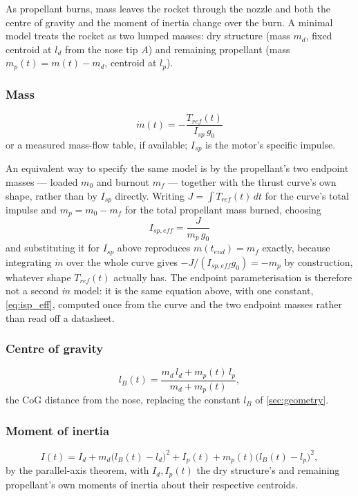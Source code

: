 As propellant burns, mass leaves the rocket through the nozzle and both the centre of gravity and
the moment of inertia change over the burn. A minimal model treats the rocket as two lumped
masses: dry structure (mass $m_d$, fixed centroid at $l_d$ from the nose tip $A$) and remaining
propellant (mass $m_p(t)=m(t)-m_d$, centroid at $l_p$).

\subsubsection{Mass}
\begin{equation}
    \dot{m}(t) = -\frac{T_{ref}(t)}{I_{sp}\,g_0}
\end{equation}
or a measured mass-flow table, if available; $I_{sp}$ is the motor's specific impulse.

An equivalent way to specify the same model is by the propellant's two endpoint masses --- loaded
$m_0$ and burnout $m_f$ --- together with the thrust curve's own shape, rather than by $I_{sp}$
directly. Writing $J=\int T_{ref}(t)\,dt$ for the curve's total impulse and $m_p=m_0-m_f$ for the
total propellant mass burned, choosing
\begin{equation}
    I_{sp,eff} = \frac{J}{m_p\,g_0} \label{eq:isp_eff}
\end{equation}
and substituting it for $I_{sp}$ above reproduces $m(t_{end})=m_f$ exactly, because integrating
$\dot m$ over the whole curve gives $-J/(I_{sp,eff}g_0)=-m_p$ by construction, whatever shape
$T_{ref}(t)$ actually has. The endpoint parameterisation is therefore not a second $\dot m$ model:
it is the same equation above, with one constant, \eqref{eq:isp_eff}, computed once from the curve
and the two endpoint masses rather than read off a datasheet.

\subsubsection{Centre of gravity}
\begin{equation}
    l_B(t) = \frac{m_d\,l_d + m_p(t)\,l_p}{m_d + m_p(t)},
\end{equation}
the CoG distance from the nose, replacing the constant $l_B$ of \autoref{sec:geometry}.

\subsubsection{Moment of inertia}
\begin{equation}
    I(t) = I_d + m_d\bigl(l_B(t)-l_d\bigr)^2 + I_p(t) + m_p(t)\bigl(l_B(t)-l_p\bigr)^2,
\end{equation}
by the parallel-axis theorem, with $I_d,I_p(t)$ the dry structure's and remaining propellant's own
moments of inertia about their respective centroids.

